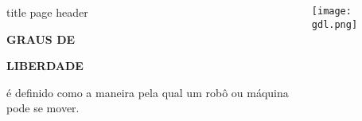 \begin{frame}
    \begin{columns}
        ~\hfill
            \begin{beamercolorbox}[sep=8em, colsep*=18pt, wd=\textwidth,ht=\paperheight]{title page header}
                \begin{center}
                    \textbf{\huge{GRAUS DE}}\par
                    \vspace*{0.3cm}
                    \textbf{\huge{LIBERDADE}}\par
                    \vspace*{0.3cm}
                    é definido como a maneira pela qual um robô ou máquina pode se mover.
                \end{center}
            \end{beamercolorbox}%
        \begin{center}
            \texttt{[image: gdl.png]}
        \end{center}
            
    \end{columns}
  
 \end{frame}
